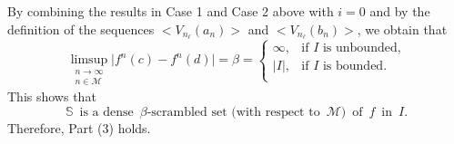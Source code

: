 \documentclass[12pt]{article}
\begin{document}
By combining the results in Case 1 and Case 2 above with $i = 0$ and by the definition of the sequences $<V_{n_\ell}(a_n)>$ and $<V_{n_\ell}(b_n)>$, we obtain that 
$$
\limsup_{\substack{n \to \infty \\ n \in \mathcal M}} \big|f^n(c) - f^n(d)\big| = \beta = \begin{cases}
                       \infty, & \text{if $I$ is unbounded,} \\
                       |I|, & \text{if $I$ is bounded.} \\
                        \end{cases}
$$
This shows that 
$$
\mathbb S \,\,\, \text{is a dense} \,\,\, \beta\text{-scrambled set (with respect to} \,\,\, \mathcal M) \,\,\, \text{of} \,\,\, f \,\,\, \text{in} \,\,\, I.
$$
Therefore, Part (3) holds.
\end{document}
